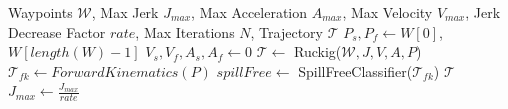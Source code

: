 \begin{algorithm} \footnotesize
\caption{Spill Free Time Parametization (SFTP)} \label{alg:sftp}
\begin{algorithmic}[1]
 Waypoints $\mathcal{W}$, Max Jerk $J_{max}$, Max Acceleration $A_{max}$, Max Velocity $V_{max}$, Jerk Decrease Factor $rate$, Max Iterations $N$,
 Trajectory $\mathcal{T}$
\STATE $P_{s}, P_{f} \gets W[0]$, $W[length(W)-1]$
\STATE $V_{s}, V_{f}, A_{s}, A_{f} \gets 0$
 \label{sftp:loop}
    \STATE $\mathcal{T} \gets$ Ruckig($\mathcal{W}, J, V, A, P$)
    \STATE $\mathcal{T}_{fk} \gets ForwardKinematics(P)$ \label{sftp:fk}
    \STATE $spillFree \gets$ SpillFreeClassifier($\mathcal{T}_{fk}$) \label{sftp:sfc}
        \RETURN $\mathcal{T}$ \label{sftp:stop}   
    \ELSE
    \STATE $J_{max} \gets \frac{J_{max}}{rate}$ \label{sftp:jerk_reduce}
    \ENDIF
\ENDFOR
\end{algorithmic}
\end{algorithm}
